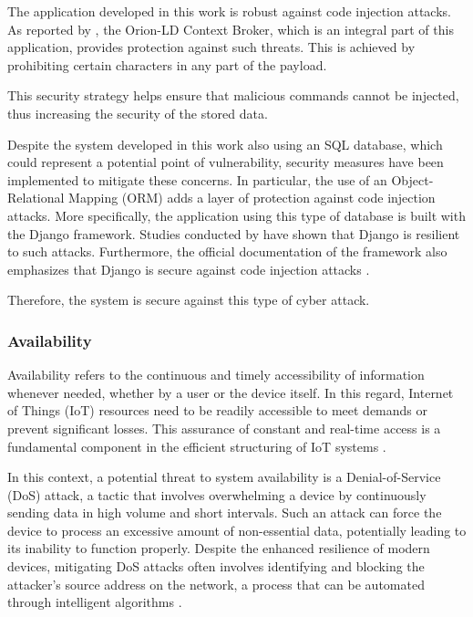 The application developed in this work is robust against code injection attacks. As reported by \textcite{etsi2023}, the Orion-LD Context Broker, which is an integral part of this application, provides protection against such threats. This is achieved by prohibiting certain characters in any part of the payload.

This security strategy helps ensure that malicious commands cannot be injected, thus increasing the security of the stored data.

Despite the system developed in this work also using an SQL database, which could represent a potential point of vulnerability, security measures have been implemented to mitigate these concerns. In particular, the use of an Object-Relational Mapping (ORM) adds a layer of protection against code injection attacks. More specifically, the application using this type of database is built with the Django framework. Studies conducted by \textcite{duisebekova2021django} have shown that Django is resilient to such attacks. Furthermore, the official documentation of the framework also emphasizes that Django is secure against code injection attacks \cite{django-docs}.

Therefore, the system is secure against this type of cyber attack.

\subsubsection{Availability}
Availability refers to the continuous and timely accessibility of information whenever needed, whether by a user or the device itself. In this regard, Internet of Things (IoT) resources need to be readily accessible to meet demands or prevent significant losses. This assurance of constant and real-time access is a fundamental component in the efficient structuring of IoT systems \cite{Ervural2018}.

In this context, a potential threat to system availability is a Denial-of-Service (DoS) attack, a tactic that involves overwhelming a device by continuously sending data in high volume and short intervals. Such an attack can force the device to process an excessive amount of non-essential data, potentially leading to its inability to function properly. Despite the enhanced resilience of modern devices, mitigating DoS attacks often involves identifying and blocking the attacker's source address on the network, a process that can be automated through intelligent algorithms \cite{DUKE20024}.

